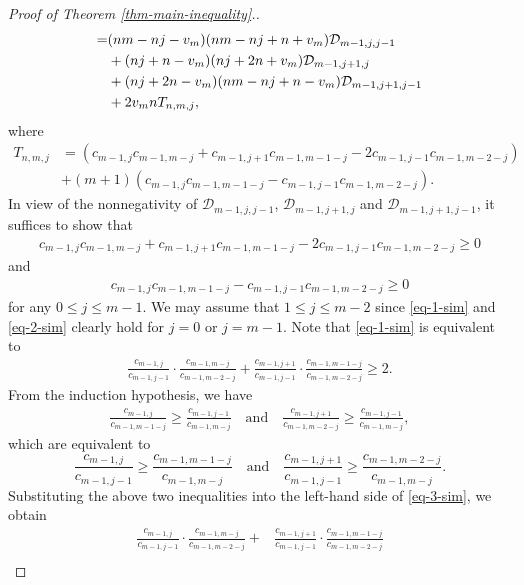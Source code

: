 \documentclass[10pt,a4paper]{amsart}
\begin{document}
\begin{proof}[Proof of Theorem \ref{thm-main-inequality}.]
\begin{align}
       =& (nm-nj-v_m)(nm-nj+n+v_m)\mathcal{D}_{m-1,j,j-1} \notag \\ 
       &+(nj+n-v_m)(nj+2n+v_m)\mathcal{D}_{m-1,j+1,j} \notag\\ 
      &+(nj+2n-v_m)(nm-nj+n-v_m)\mathcal{D}_{m-1,j+1,j-1} \notag \\
      &+2v_mnT_{n,m,j}, \qquad \qquad \qquad ~~~\label{conj-1-inq-D}
 \end{align}
 where 
 \begin{align*}
   T_{n,m,j}&=(c_{m-1,j} c_{m-1,m-j}+c_{m-1,j+1}c_{m-1,m-1-j}-2c_{m-1,j-1}c_{m-1,m-2-j})\\
   &+(m+1)(c_{m-1,j}c_{m-1,m-1-j} -c_{m-1,j-1}c_{m-1,m-2-j}). 
 \end{align*}
In view of the nonnegativity of $\mathcal{D}_{m-1,j,j-1}$, $\mathcal{D}_{m-1,j+1,j}$ and $\mathcal{D}_{m-1,j+1,j-1}$, 
it suffices to show that 
\begin{align}\label{eq-1-sim}
c_{m-1,j} c_{m-1,m-j}+c_{m-1,j+1}c_{m-1,m-1-j}-2c_{m-1,j-1}c_{m-1,m-2-j}\ge 0
\end{align}
and
\begin{align}\label{eq-2-sim}
c_{m-1,j}c_{m-1,m-1-j} -c_{m-1,j-1}c_{m-1,m-2-j}\ge 0
\end{align}
for any $0 \leq j \leq m - 1$. We may assume that $1 \leq j \leq m - 2$ since \eqref{eq-1-sim} and \eqref{eq-2-sim} clearly hold for $j=0$ or $j=m-1$.
Note that \eqref{eq-1-sim} is equivalent to 
\begin{align}\label{eq-3-sim}
\frac{c_{m-1,j}}{c_{m-1,j-1}} \cdot \frac{c_{m-1,m-j}}{c_{m-1,m-2-j}}+\frac{c_{m-1,j+1}}{c_{m-1,j-1}}\cdot\frac{c_{m-1,m-1-j}}{c_{m-1,m-2-j}}\ge 2.
\end{align}
From the induction hypothesis, we have
\begin{align}\label{eq-3-sim-2}
\frac{c_{m-1,j}}{c_{m-1,m-1-j}}\ge \frac{c_{m-1,j-1}}{c_{m-1,m-j}} \quad \text{and} \quad 
\frac{c_{m-1,j+1}}{c_{m-1,m-2-j}}\ge\frac{c_{m-1,j-1}}{c_{m-1,m-j}},
\end{align}
which are equivalent to
$$\frac{c_{m-1,j}}{c_{m-1,j-1}}\ge \frac{c_{m-1,m-1-j}}{c_{m-1,m-j}} \quad \text{and}\quad
\frac{c_{m-1,j+1}}{c_{m-1,j-1}}\ge \frac{c_{m-1,m-2-j}}{c_{m-1,m-j}}.$$
Substituting the above two inequalities into the left-hand side of
\eqref{eq-3-sim}, we obtain
 \begin{align*}%
     \frac{c_{m-1,j}}{c_{m-1,j-1}}\cdot\frac{c_{m-1,m-j}}{c_{m-1,m-2-j}}+&\frac{c_{m-1,j+1}}{c_{m-1,j-1}}\cdot\frac{c_{m-1,m-1-j}}{c_{m-1,m-2-j}}
     \\[5pt]

\end{align*}
\end{proof}
\end{document}
